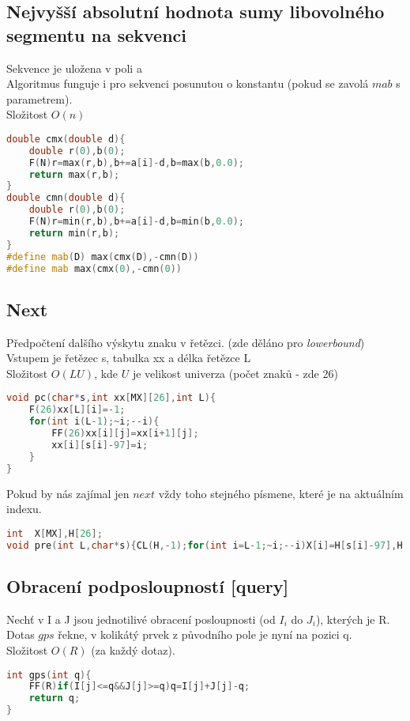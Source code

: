 \documentclass[11pt]{article}
\begin{document}
\subsection{Nejvyšší absolutní hodnota sumy libovolného segmentu na sekvenci}
Sekvence je uložena v poli \textsf{a}
\\Algoritmus funguje i pro sekvenci posunutou o konstantu (pokud se zavolá $mab$ s parametrem).
\\Složitost $O(n)$
\begin{lstlisting}[language=C++]
double cmx(double d){
    double r(0),b(0);
    F(N)r=max(r,b),b+=a[i]-d,b=max(b,0.0);
    return max(r,b);
}
double cmn(double d){
    double r(0),b(0);
    F(N)r=min(r,b),b+=a[i]-d,b=min(b,0.0);
    return min(r,b);
}
#define mab(D) max(cmx(D),-cmn(D))
#define mab max(cmx(0),-cmn(0))
\end{lstlisting}
\subsection{Next}
Předpočtení dalšího výskytu znaku v řetězci. (zde děláno pro \textit{lowerbound})
\\Vstupem je řetězec \textsf{s}, tabulka \textsf{xx} a délka řetězce \textsf{L}
\\Složitost $O(LU)$, kde $U$ je velikost univerza (počet znaků - zde 26)
\begin{lstlisting}[language=C++]
void pc(char*s,int xx[MX][26],int L){
    F(26)xx[L][i]=-1;
    for(int i(L-1);~i;--i){
        FF(26)xx[i][j]=xx[i+1][j];
        xx[i][s[i]-97]=i;
    }
}
\end{lstlisting}
Pokud by nás zajímal jen $next$ vždy toho stejného písmene, které je na aktuálním indexu.
\begin{lstlisting}[language=C++]
int  X[MX],H[26];
void pre(int L,char*s){CL(H,-1);for(int i=L-1;~i;--i)X[i]=H[s[i]-97],H[s[i]-97]=i;}
\end{lstlisting}
\subsection{Obracení podposloupností [query]}
Nechť v \textsf{I} a \textsf{J} jsou jednotilivé obracení posloupnosti (od $I_i$ do $J_i$), kterých je \textsf{R}. Dotas $gps$ řekne, v kolikátý prvek z původního pole je nyní na pozici \textsf{q}.
\\Složitost $O(R)$ (za každý dotaz).
\begin{lstlisting}[language=C++]
int gps(int q){
    FF(R)if(I[j]<=q&&J[j]>=q)q=I[j]+J[j]-q;
    return q;
}
\end{lstlisting}
\end{document}
